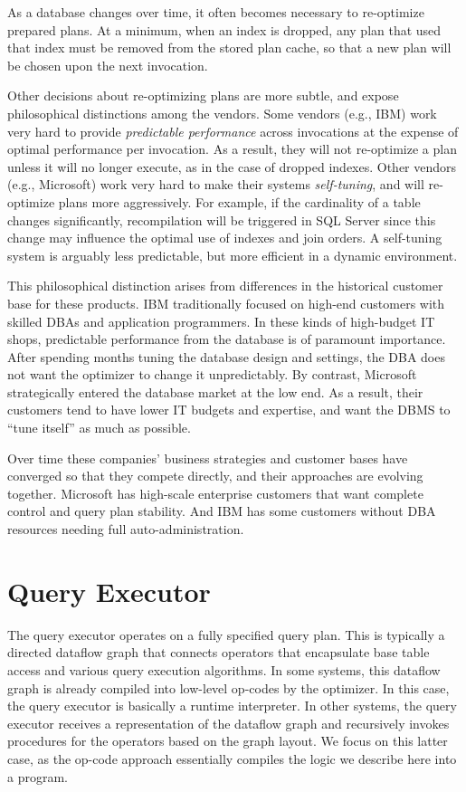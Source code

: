 \documentclass[b5paper,11pt,twoside,openright]{book}
\begin{document}
As a database changes over time, it often becomes necessary to
re-optimize prepared plans. At a minimum, when an index is dropped, any
plan that used that index must be removed from the stored plan cache, so
that a new plan will be chosen upon the next invocation.

Other decisions about re-optimizing plans are more subtle, and expose
philosophical distinctions among the vendors. Some vendors (e.g., IBM)
work very hard to provide \emph{predictable performance} across
invocations at the expense of optimal performance per invocation. As a
result, they will not re-optimize a plan unless it will no longer
execute, as in the case of dropped indexes. Other vendors (e.g.,
Microsoft) work very hard to make their systems \emph{self-tuning}, and
will re-optimize plans
more aggressively. For example, if the cardinality of a table changes
significantly, recompilation will be triggered in SQL Server since this
change may influence the optimal use of indexes and join orders. A
self-tuning system is arguably less predictable, but more efficient in a
dynamic environment.

This philosophical distinction arises from differences in the historical
customer base for these products. IBM traditionally focused on high-end
customers with skilled DBAs and application programmers. In these kinds
of high-budget IT shops, predictable performance from the database is of
paramount importance. After spending months tuning the database design
and settings, the DBA does not want the optimizer to change it
unpredictably. By contrast, Microsoft strategically entered the database
market at the low end. As a result, their customers tend to have lower
IT budgets and expertise, and want the DBMS to ``tune itself'' as much
as possible.

Over time these companies' business strategies and customer bases have
converged so that they compete directly, and their approaches are
evolving together. Microsoft has high-scale enterprise customers that
want complete control and query plan stability. And IBM has some
customers without DBA resources needing full auto-administration.

\hypertarget{query-executor}{%
\section{Query Executor}\label{query-executor}}

The query executor operates on a fully specified query plan. This is
typically a directed dataflow graph that connects operators that
encapsulate base table access and various query execution algorithms. In
some systems, this dataflow graph is already compiled into low-level
op-codes by the optimizer. In this case, the query executor is basically
a runtime interpreter. In other systems, the query executor receives a
representation of the dataflow graph and recursively invokes procedures
for the operators based on the graph layout. We focus on this latter
case, as the op-code approach essentially compiles the logic we describe
here into a program.
\end{document}
